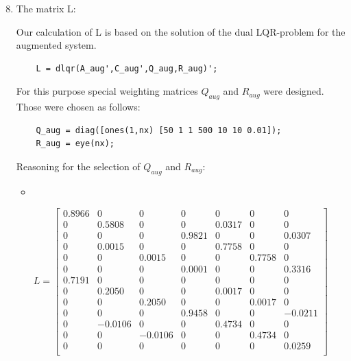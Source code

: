 \documentclass[11pt]{article}
\begin{document}
\begin{enumerate}
    \setcounter{enumi}{7}
    \item The matrix L:
    
    Our calculation of L is based on the solution of the dual LQR-problem for the augmented system.
    
    \begin{verbatim}
    L = dlqr(A_aug',C_aug',Q_aug,R_aug)';
    \end{verbatim}
    
    For this purpose special weighting matrices $Q_{aug}$ and $R_{aug}$ were designed. Those were chosen as follows:
    
    \begin{verbatim}
    Q_aug = diag([ones(1,nx) [50 1 1 500 10 10 0.01]);
    R_aug = eye(nx);
    \end{verbatim}
    
    Reasoning for the selection of $Q_{aug}$ and $R_{aug}$:
    
    \begin{itemize}
    \item 
    \end{itemize}
    
    \begin{equation}
    L = \begin{bmatrix} 
    0.8966&0&0&0&0&0&0\\
    0&0.5808&0&0&0.0317&0&0\\
    0&0&0&0.9821&0&0&0.0307\\
    0&0.0015&0&0&0.7758&0&0\\
    0&0&0.0015&0&0&0.7758&0\\
    0&0&0&0.0001&0&0&0.3316\\
    0.7191&0&0&0&0&0&0\\
    0&0.2050&0&0&0.0017&0&0\\
    0&0&0.2050&0&0&0.0017&0\\
    0&0&0&0.9458&0&0&-0.0211\\
    0&-0.0106&0&0&0.4734&0&0\\
    0&0&-0.0106&0&0&0.4734&0\\
    0&0&0&0&0&0&0.0259\\
    \end{bmatrix}
    \end{equation}
    

\end{enumerate}
\end{document}
